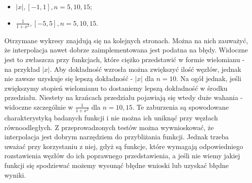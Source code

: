 \documentclass{article}
\begin{document}
\begin{itemize}
    \item $|x|, [-1,1], n=5,10,15$;
    \item $\frac{1}{1+x^2}, [-5,5], n=5,10,15$.
\end{itemize}
\quad\newline
Otrzymane wykresy znajdują się 
na kolejnych stronach. Można na 
nich zauważyć, że interpolacja 
nawet dobrze zaimplementowana jest 
podatna na błędy. Widoczne jest to 
zwłaszcza przy funkcjach, które ciężko 
przedstawić w formie wielomianu - na przykład 
$|x|$. 
\newline
\newline
Aby dokładność wzrosła można 
zwiększyć ilość węzłów, jednak nie 
zawsze uzyskuje się lepszą dokładność - $|x|$ 
dla $n = 10$. Na ogół jednak, jeśli 
zwiększymy stopień wielomianu to 
dostaniemy lepszą dokładność w środku przedziału. 
Niestety na krańcach przedziału pojawiają się wtedy 
duże wahania - widoczne szczególnie w 
$\frac{1}{1+x^2}$ dla $n = 10,15$. 
Te zaburzenia są spowodowane charakterystyką 
badanych funkcji i nie można ich 
uniknąć przy węzłach równoodległych.
\newline
\newline
Z przeprowadzonych testów można 
wywnioskować, że interpolacja jest dobrym 
narzędziem do przybliżania funkcji. 
Jednak trzeba uważać przy korzystaniu 
z niej, gdyż są funkcje, które 
wymagają odpowiedniego rozstawienia 
węzłów do ich poprawnego 
przedstawienia, a jeśli nie wiemy 
jakiej funkcji się spodziewać możemy 
wysunąć błędne wnioski lub uzyskać 
błędne wyniki.
\end{document}
